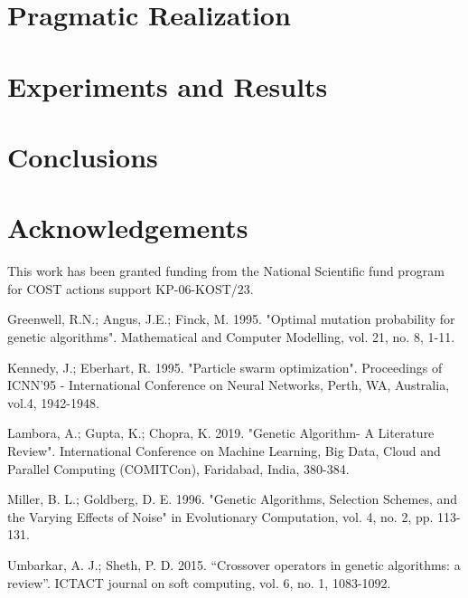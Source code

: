 \documentclass[runningheads]{llncs}
\begin{document}
\section{Pragmatic Realization}

\section{Experiments and Results}

\section{Conclusions}

\section*{Acknowledgements} This work has been granted funding from the National Scientific fund program for COST actions support KP-06-KOST/23.

\begin{thebibliography}{8}

 Greenwell, R.N.; Angus, J.E.; Finck, M. 1995. "Optimal mutation probability for genetic algorithms". Mathematical and Computer Modelling, vol. 21, no. 8, 1-11.

 Kennedy, J.; Eberhart, R. 1995. "Particle swarm optimization". Proceedings of ICNN'95 - International Conference on Neural Networks, Perth, WA, Australia, vol.4, 1942-1948.

 Lambora, A.; Gupta, K.; Chopra, K. 2019. "Genetic Algorithm- A Literature Review". International Conference on Machine Learning, Big Data, Cloud and Parallel Computing (COMITCon), Faridabad, India, 380-384.

 Miller, B. L.; Goldberg, D. E. 1996. "Genetic Algorithms, Selection Schemes, and the Varying Effects of Noise" in Evolutionary Computation, vol. 4, no. 2, pp. 113-131.

 Umbarkar, A. J.; Sheth, P. D. 2015. “Crossover operators in genetic algorithms: a review”. ICTACT journal on soft computing, vol. 6, no. 1, 1083-1092.

\end{thebibliography}
\end{document}
